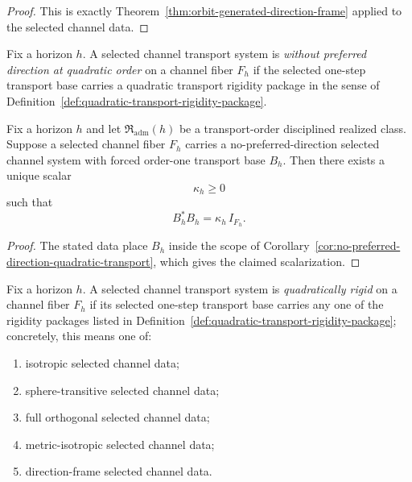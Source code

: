 \begin{proof}
This is exactly Theorem~\ref{thm:orbit-generated-direction-frame} applied to
the selected channel data.
\end{proof}

\begin{definition}
\label{def:no-preferred-direction-selected-channel-system}
Fix a horizon $h$. A selected channel transport system is \emph{without
preferred direction at quadratic order} on a channel fiber $F_h$ if the
selected one-step transport base carries a quadratic transport rigidity package
in the sense of Definition~\ref{def:quadratic-transport-rigidity-package}.
\end{definition}

\begin{corollary}
\label{cor:realized-no-preferred-direction-quadratic-transport}
Fix a horizon $h$ and let $\mathfrak R_{\mathrm{adm}}(h)$ be a transport-order
disciplined realized class. Suppose a selected channel fiber $F_h$ carries a
no-preferred-direction selected channel system with forced order-one transport
base $B_h$. Then there exists a unique scalar
\[
\kappa_h\ge 0
\]
such that
\[
B_h^*B_h=\kappa_h\,I_{F_h}.
\]
\end{corollary}

\begin{proof}
The stated data place $B_h$ inside the scope of
Corollary~\ref{cor:no-preferred-direction-quadratic-transport}, which gives
the claimed scalarization.
\end{proof}

\begin{definition}
\label{def:quadratically-rigid-selected-channel-system}
Fix a horizon $h$. A selected channel transport system is
\emph{quadratically rigid} on a channel fiber $F_h$ if its selected one-step
transport base carries any one of the rigidity packages listed in
Definition~\ref{def:quadratic-transport-rigidity-package}; concretely, this
means one of:
\begin{enumerate}[label=(\roman*), leftmargin=2em, itemsep=0.2em]
\item isotropic selected channel data;
\item sphere-transitive selected channel data;
\item full orthogonal selected channel data;
\item metric-isotropic selected channel data;
\item direction-frame selected channel data.
\end{enumerate}
\end{definition}

